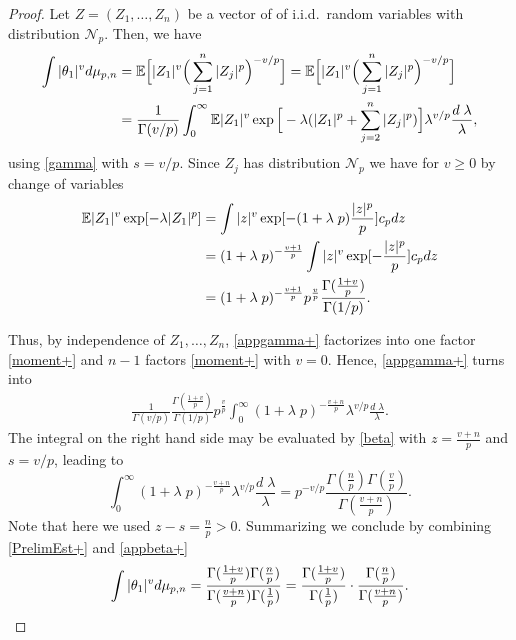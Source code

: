 \documentclass[a4paper,12pt]{amsart}
\numberwithin{equation}{section}
\theoremstyle{remark}
\def\E{{\mathbb E}}
\begin{document}
\begin{proof}
	Let $Z=(Z_1, \ldots, Z_n)$ be a vector of of i.i.d.\ random variables with distribution $\mathcal{N}_p$. Then, we have
	\begin{align}
		\int |\theta_1|^v d\mu_{p,n} &= \E \Big[|Z_1|^v\Big(\sum_{j=1}^n |Z_j|^p\Big)^{-v/p}\Big]
		= \E \Big[|Z_1|^v\Big(\sum_{j=1}^n |Z_j|^p\Big)^{-v/p}\Big] \notag \\
		&= \frac{1}{\Gamma(v/p)}  \int_0^{\infty} \E |Z_1|^v   \exp\Big[ - \lambda(|Z_1|^p + \sum_{j=2}^n |Z_j|^p)\Big] \lambda^{v/p} \frac{d\;\lambda}{\lambda} \label{appgamma+} ,
	\end{align}
	using \eqref{gamma} with $s=v/p$. Since $Z_j$ has distribution $\mathcal{N}_p$ we have for $v\ge 0$ by change of variables
	\begin{align}
		\E |Z_1|^v \exp[ -\lambda |Z_1|^p] &= \int |z|^v \exp[ - (1+\lambda\;p) \frac{|z|^p} {p} ] c_p dz \notag \\
		&= (1+\lambda\;p)^{- \frac{v+1}{p}} \int |z|^v \exp[ -  \frac{|z|^p} {p} ]c_p dz  \notag \\
		&= (1+\lambda\;p)^{- \frac{v+1}{p}} p^{\frac{v}{p}}  \frac{\Gamma(\frac{1 + v}{p})}{\Gamma(1/p)}.\label{moment+}
	\end{align}
	
	Thus, by independence of $Z_1, \ldots, Z_n$, \eqref{appgamma+} factorizes into one factor \eqref{moment+} and $n-1$ factors \eqref{moment+} with $v=0$. Hence, \eqref{appgamma+} turns into
	\begin{align}\label{PrelimEst+}
		\frac{1}{\Gamma(v/p)} \frac{\Gamma(\frac{1 + v}{p})}{\Gamma(1/p)} p^{\frac{v}{p}} \int_{0}^{\infty}  (1+\lambda\;p)^{- \frac{v+n}{p}} \lambda^{v/p} \frac{d\;\lambda}{\lambda}.
	\end{align}
	The integral on the right hand side may be evaluated by \eqref{beta} with $z=\frac{v+n}{p}$ and $s= v/p$, leading to
	\begin{equation}\int_{0}^{\infty}  (1+\lambda\;p)^{- \frac{v+n}{p}} \lambda^{v/p} \frac{d\;\lambda}{\lambda}= p^{-v/p} \frac{\Gamma(\frac{n}{p})\Gamma(\frac{v}{p})}{\Gamma(\frac{v+n}{p})}. \label{appbeta+}
	\end{equation}
	Note that here we used $z-s= \frac{n}{p}>0$. Summarizing we conclude by combining \eqref{PrelimEst+} and \eqref{appbeta+}
	\[
		\int |\theta_1|^v d\mu_{p,n} = \frac{ \Gamma(\frac{1 + v}{p})\Gamma(\frac{n}{p})} {\Gamma(\frac{v+n}{p}) \Gamma(\frac 1 p)}\\
		= \frac{ \Gamma(\frac{1 + v}{p})} {\Gamma(\frac 1 p)} \cdot \frac{\Gamma(\frac{n} {p})} {\Gamma(\frac{v+n}{p})}.
	\]
	

\end{proof}
\end{document}

